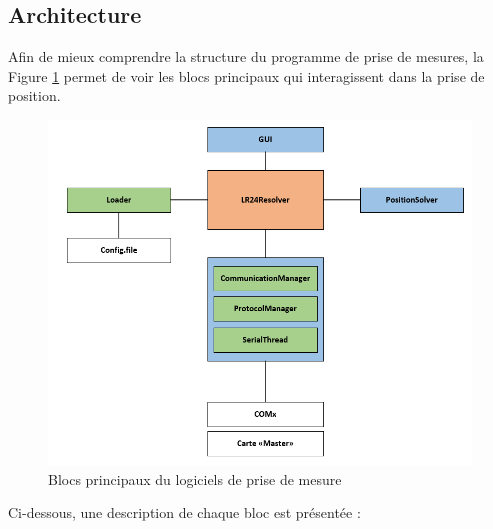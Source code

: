 \subsection{Architecture}
Afin de mieux comprendre la structure du programme de prise de mesures, la Figure \ref{fig:archLR24} permet de voir les blocs principaux qui interagissent dans la prise de position.

\begin{figure}[htp]
	\begin{center}
		\includegraphics[scale=0.7]{figures/architecture_LR24.PNG}
		\caption{Blocs principaux du logiciels de prise de mesure}
		\label{fig:archLR24} %
	\end{center}
\end{figure}

Ci-dessous, une description de chaque bloc est présentée :

